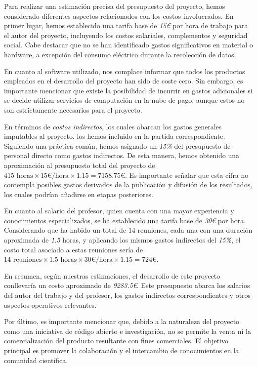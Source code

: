 Para realizar una estimación precisa del presupuesto del proyecto, hemos considerado diferentes aspectos relacionados 
con los costos involucrados. En primer lugar, hemos establecido una tarifa base de \textit{15€} por hora de trabajo 
para el autor del proyecto, incluyendo los costos salariales, complementos y seguridad social. Cabe destacar que no 
se han identificado gastos significativos en material o hardware, a excepción del consumo eléctrico durante la recolección 
de datos.

En cuanto al software utilizado, nos complace informar que todos los productos empleados en el desarrollo del proyecto 
han sido de coste cero. Sin embargo, es importante mencionar que existe la posibilidad de incurrir en gastos adicionales 
si se decide utilizar servicios de computación en la nube de pago, aunque estos no son estrictamente necesarios para el
 proyecto.

En términos de \textit{costos indirectos}, los cuales abarcan los gastos generales imputables al proyecto, los hemos 
incluido en la partida correspondiente. Siguiendo una práctica común, hemos asignado un \textit{15\%} del presupuesto 
de personal directo como gastos indirectos. De esta manera, hemos obtenido una aproximación al presupuesto total del 
proyecto de $415 \text{ horas} \times 15\textit{€}/\text{hora} \times 1.15 = 7158.75\textit{€}$. Es importante señalar que esta cifra 
no contempla posibles gastos derivados de la publicación y difusión de los resultados, los cuales podrían añadirse en 
etapas posteriores.

En cuanto al salario del profesor, quien cuenta con una mayor experiencia y conocimientos especializados, se ha 
establecido una tarifa base de \textit{30€} por hora. Considerando que ha habido un total de 14 reuniones, cada 
una con una duración aproximada de \textit{1.5} horas, y aplicando los mismos gastos indirectos del \textit{15\%}, 
el costo total asociado a estas reuniones sería de $14 \text{ reuniones} \times 1.5  \text{ horas} \times 30\textit{€}/\text{hora} \times 1.15 = 724\textit{€}$.

En resumen, según nuestras estimaciones, el desarrollo de este proyecto conllevaría un costo aproximado de \textit{9283.5€}. 
Este presupuesto abarca los salarios del autor del trabajo y del profesor, los gastos indirectos correspondientes y otros 
aspectos operativos relevantes.

Por último, es importante mencionar que, debido a la naturaleza del proyecto como una iniciativa de código abierto e 
investigación, no se permite la venta ni la comercialización del producto resultante con fines comerciales. El objetivo 
principal es promover la colaboración y el intercambio de conocimientos en la comunidad científica.

